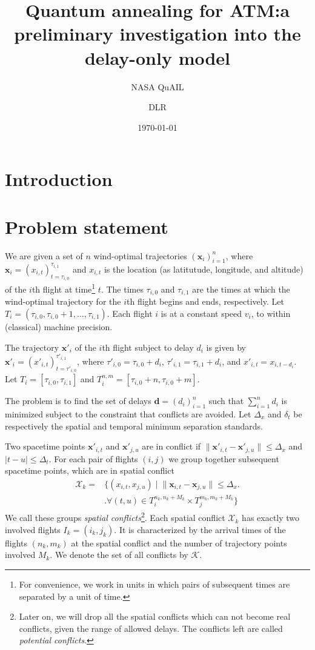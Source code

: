 \documentclass[twocolumn]{article}
\date{\today}
\author{NASA QuAIL \and DLR}
\title{Quantum annealing for ATM:\@ a preliminary investigation into the delay-only model}
\begin{document}
\maketitle

\section{Introduction}

\section{Problem statement}

We are given a set of $n$ wind-optimal trajectories 
${\left(\mathbf{x}_i\right)}_{i=1}^n$, 
where 
$\mathbf{x}_i = {\left(x_{i,t}\right)}_{t=\tau_{i,0}}^{\tau_{i,1}}$ 
and 
$x_{i, t}$ is the location (as latitutude, longitude, and altitude) of the $i$th flight at time\footnote{For convenience, we work in units in which pairs of subsequent times are separated by a unit of time.} $t$.
The times $\tau_{i,0}$ and $\tau_{i, 1}$ are the times at which the wind-optimal trajectory for the $i$th flight begins and ends, respectively.
Let $T_i = \left(\tau_{i, 0}, \tau_{i, 0} + 1, \ldots, \tau_{i, 1}\right)$.
Each flight $i$ is at a constant speed $v_i$, to within (classical) machine precision.

The trajectory $\mathbf{x}'_i$ of the $i$th flight subject to delay $d_i$ is given by
$\mathbf{x}'_i = {\left(x'_{i,t}\right)}_{t=\tau'_{i,0}}^{\tau'_{i,1}}$,
where 
$\tau'_{i,0} = \tau_{i,0} + d_i$,
$\tau'_{i,1} = \tau_{i,1} + d_i$, and
${x'}_{i,t} = x_{i, t - d_i}$.
Let $T_i = [\tau_{i, 0}, \tau_{i, 1}]$ and
$T_i^{n, m} = [\tau_{i,0} + n, \tau_{i,0} + m]$.

The problem is to find the set of delays 
$\mathbf d = {\left(d_i\right)}_{i=1}^n$ such that $\sum_{i=1}^n d_i$ is minimized subject to the constraint that conflicts are avoided.
Let $\Delta_x$ and $\delta_t$ be respectively the spatial and temporal minimum separation standards. 

Two spacetime points $\mathbf x'_{i,t}$ and $\mathbf x'_{j,u}$ are in conflict if 
$\|\mathbf x'_{i,t} - \mathbf x'_{j,u}\| \leq \Delta_x$ and $|t - u| \leq \Delta_t$.
For each pair of flights $(i, j)$ we group together subsequent spacetime points, which are in spatial conflict
\begin{align*}
    \mathcal{X}_k = &\bigl\{ (x_{i,t},x_{j,u}) \; | \;  \|\mathbf x_{i,t} - \mathbf x_{j,u}\| \leq \Delta_x \bigr. \\
    &\bigl. \forall (t, u) \in T_{i}^{n_k, n_k + M_k}  \times T_{j}^{m_k, m_k + M_k}\bigr\} 
\end{align*}
We call these groups \emph{spatial conflicts}\footnote{Later on, we will drop all the spatial conflicts which can not become real conflicts, given the range of allowed delays. The conflicts left are called \emph{potential conflicts}.}.
Each spatial conflict $\mathcal{X}_k$ has exactly two involved flights $I_k = (i_k, j_k)$.
It is characterized by  the arrival times of the flights $(n_k, m_k)$ at the spatial conflict and the number of trajectory points involved $M_k$.
We denote the set of all conflicts by $\mathcal{K}$.
\end{document}

